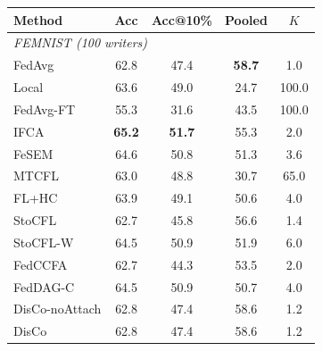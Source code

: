 \scriptsize
\setlength{\tabcolsep}{3.5pt}
\begin{tabular}{lcccc}
\toprule
Method & Acc & Acc@10\% & Pooled & $K$ \\
\midrule
\multicolumn{5}{l}{\textit{FEMNIST (100 writers)}}\\
FedAvg & 62.8 & 47.4 & \textbf{58.7} & 1.0 \\
Local & 63.6 & 49.0 & 24.7 & 100.0 \\
FedAvg-FT & 55.3 & 31.6 & 43.5 & 100.0 \\
IFCA & \textbf{65.2} & \textbf{51.7} & 55.3 & 2.0 \\
FeSEM & 64.6 & 50.8 & 51.3 & 3.6 \\
MTCFL & 63.0 & 48.8 & 30.7 & 65.0 \\
FL+HC & 63.9 & 49.1 & 50.6 & 4.0 \\
StoCFL & 62.7 & 45.8 & 56.6 & 1.4 \\
StoCFL-W & 64.5 & 50.9 & 51.9 & 6.0 \\
FedCCFA & 62.7 & 44.3 & 53.5 & 2.0 \\
FedDAG-C & 64.5 & 50.9 & 50.7 & 4.0 \\
DisCo-noAttach & 62.8 & 47.4 & 58.6 & 1.2 \\
DisCo & 62.8 & 47.4 & 58.6 & 1.2 \\
\bottomrule
\end{tabular}
